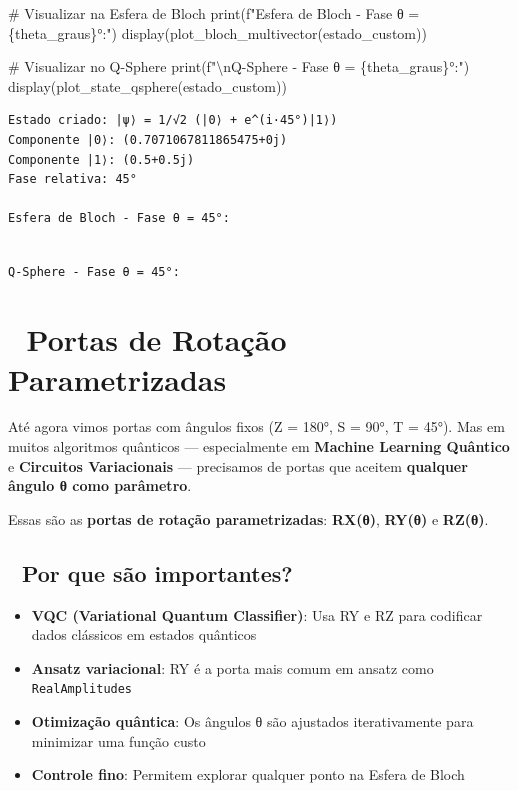 \documentclass[
  brazilian,
]{report}
\newenvironment{Shaded}{\begin{snugshade}}{\end{snugshade}}
\newcommand{\BuiltInTok}[1]{\textcolor[rgb]{0.00,0.23,0.31}{#1}}
\newcommand{\CharTok}[1]{\textcolor[rgb]{0.13,0.47,0.30}{#1}}
\newcommand{\CommentTok}[1]{\textcolor[rgb]{0.37,0.37,0.37}{#1}}
\newcommand{\NormalTok}[1]{\textcolor[rgb]{0.00,0.23,0.31}{#1}}
\newcommand{\SpecialCharTok}[1]{\textcolor[rgb]{0.37,0.37,0.37}{#1}}
\newcommand{\SpecialStringTok}[1]{\textcolor[rgb]{0.13,0.47,0.30}{#1}}
\providecommand{\tightlist}{%
  \setlength{\itemsep}{0pt}\setlength{\parskip}{0pt}}
\begin{document}
\begin{tcolorbox}
\begin{Shaded}
\begin{Highlighting}[]
\CommentTok{\# Visualizar na Esfera de Bloch}
\BuiltInTok{print}\NormalTok{(}\SpecialStringTok{f"Esfera de Bloch {-} Fase θ = }\SpecialCharTok{\{}\NormalTok{theta\_graus}\SpecialCharTok{\}}\SpecialStringTok{°:"}\NormalTok{)}
\NormalTok{display(plot\_bloch\_multivector(estado\_custom))}

\CommentTok{\# Visualizar no Q{-}Sphere}
\BuiltInTok{print}\NormalTok{(}\SpecialStringTok{f"}\CharTok{\textbackslash{}n}\SpecialStringTok{Q{-}Sphere {-} Fase θ = }\SpecialCharTok{\{}\NormalTok{theta\_graus}\SpecialCharTok{\}}\SpecialStringTok{°:"}\NormalTok{)}
\NormalTok{display(plot\_state\_qsphere(estado\_custom))  }
\end{Highlighting}
\end{Shaded}

\end{tcolorbox}

\begin{verbatim}
Estado criado: |ψ⟩ = 1/√2 (|0⟩ + e^(i·45°)|1⟩)
Componente |0⟩: (0.7071067811865475+0j)
Componente |1⟩: (0.5+0.5j)
Fase relativa: 45°

Esfera de Bloch - Fase θ = 45°:
\end{verbatim}

\begin{verbatim}

Q-Sphere - Fase θ = 45°:
\end{verbatim}

\section{🔄 Portas de Rotação
Parametrizadas}\label{portas-de-rotauxe7uxe3o-parametrizadas}

Até agora vimos portas com ângulos fixos (Z = 180°, S = 90°, T = 45°).
Mas em muitos algoritmos quânticos --- especialmente em \textbf{Machine
Learning Quântico} e \textbf{Circuitos Variacionais} --- precisamos de
portas que aceitem \textbf{qualquer ângulo θ como parâmetro}.

Essas são as \textbf{portas de rotação parametrizadas}: \textbf{RX(θ)},
\textbf{RY(θ)} e \textbf{RZ(θ)}.

\subsection{🎯 Por que são
importantes?}\label{por-que-suxe3o-importantes}

\begin{itemize}
\tightlist
\item
  \textbf{VQC (Variational Quantum Classifier)}: Usa RY e RZ para
  codificar dados clássicos em estados quânticos
\item
  \textbf{Ansatz variacional}: RY é a porta mais comum em ansatz como
  \texttt{RealAmplitudes}
\item
  \textbf{Otimização quântica}: Os ângulos θ são ajustados
  iterativamente para minimizar uma função custo
\item
  \textbf{Controle fino}: Permitem explorar qualquer ponto na Esfera de
  Bloch
\end{itemize}
\end{document}
